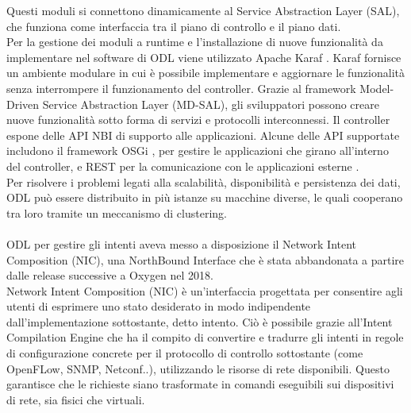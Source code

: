 Questi moduli si connettono dinamicamente al Service Abstraction Layer (SAL), che funziona come interfaccia tra il piano di controllo e il piano dati.
\\Per la gestione dei moduli a runtime e l'installazione di nuove funzionalità da implementare nel software di ODL viene utilizzato Apache Karaf \cite{Apache}.
Karaf fornisce un ambiente modulare in cui è possibile implementare e aggiornare le funzionalità senza interrompere il funzionamento del controller.
Grazie al framework Model-Driven Service Abstraction Layer (MD-SAL), gli sviluppatori possono creare nuove funzionalità sotto forma di servizi e protocolli interconnessi.
Il controller espone delle API NBI di supporto alle applicazioni. Alcune delle API supportate includono il framework OSGi \cite{osgi}, per gestire le applicazioni che girano all'interno del controller,
e REST per la comunicazione con le applicazioni esterne \cite{tesiodl2}.
\\Per risolvere i problemi legati alla scalabilità, disponibilità e persistenza dei dati, ODL può essere distribuito in più istanze su macchine diverse, le quali cooperano tra loro tramite un meccanismo di clustering.
\\
\\ODL per gestire gli intenti aveva messo a disposizione il Network Intent Composition (NIC), una NorthBound Interface che è stata abbandonata a partire dalle release successive a Oxygen nel 2018.
\\Network Intent Composition (NIC) \cite{nic} è un'interfaccia progettata per consentire agli utenti di esprimere uno stato desiderato in modo indipendente dall'implementazione sottostante, detto intento. 
Ciò è possibile grazie all'Intent Compilation Engine che ha il compito di convertire e tradurre gli intenti in regole di configurazione concrete per il protocollo di controllo sottostante (come OpenFLow, SNMP, Netconf..), utilizzando le risorse di rete disponibili.
Questo garantisce che le richieste siano trasformate in comandi eseguibili sui dispositivi di rete, sia fisici che virtuali.
